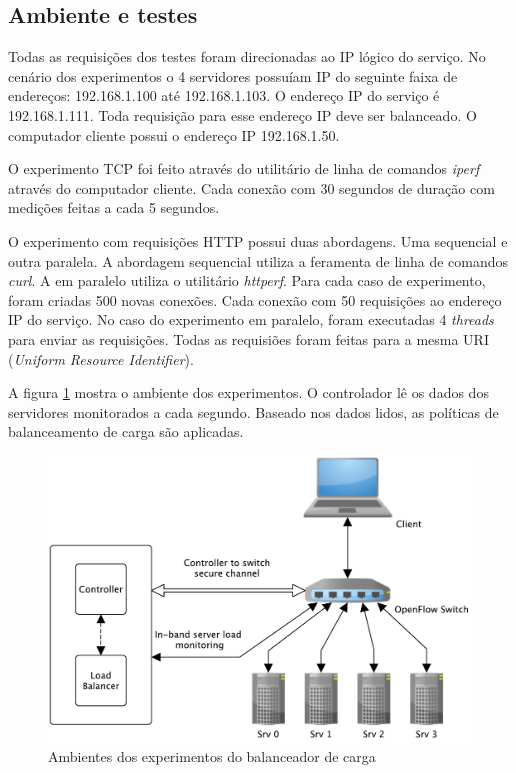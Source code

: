 \subsection{Ambiente e testes}

Todas as requisições dos testes foram direcionadas ao IP lógico do 
serviço.
No cenário dos experimentos o 4 servidores possuíam IP do seguinte faixa de 
endereços: 192.168.1.100 até 192.168.1.103.
O endereço IP do serviço é 192.168.1.111.
Toda requisição para esse endereço IP deve ser balanceado.
O computador cliente possui o endereço IP 192.168.1.50.

O experimento TCP foi feito através do utilitário de linha de comandos 
\emph{iperf} através do computador cliente.
Cada conexão com 30 segundos de duração com medições feitas a cada 5 segundos.

O experimento com requisições HTTP possui duas abordagens.
Uma sequencial e outra paralela.
A abordagem sequencial utiliza a feramenta de linha de comandos \emph{curl}.
A em paralelo utiliza o utilitário \emph{httperf}.
Para cada caso de experimento, foram criadas 500 novas conexões.
Cada conexão com 50 requisições ao endereço IP do serviço.
No caso do experimento em paralelo, foram executadas 4 \emph{threads} para 
enviar as requisições.
Todas as requisiões foram feitas para a mesma URI (\emph{Uniform Resource
Identifier}).

A figura \ref{fig:testbed} mostra o ambiente dos experimentos.
O controlador lê os dados dos servidores monitorados a cada segundo.
Baseado nos dados lidos, as políticas de balanceamento de carga são aplicadas.

\begin{figure}[htb!]
    \centering
    \includegraphics[width=\linewidth]{img/balancer-testbed-img}
    \caption{Ambientes dos experimentos do balanceador de carga}
    \label{fig:testbed}
\end{figure}

